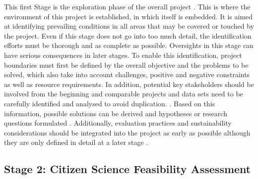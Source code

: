 This first Stage is the exploration phase of the overall project \autocite{citizenscience.govBasicStepsYour}. This is where the environment of this project is established, in which itself is embedded. It is aimed at identifying prevailing conditions in all areas that may be covered or touched by the project. Even if this stage does not go into too much detail, the identification efforts must be thorough and as complete as possible. Oversights in this stage can have serious consequences in later stages. To enable this identification, project boundaries must first be defined by the overall objective and the problems to be solved, which also take into account challenges, positive and negative constraints as well as resource requirements. In addition, potential key stakeholders should be involved from the beginning and comparable projects and data sets need to be carefully identified and analysed to avoid duplication. \autocite{citizenscience.govBasicStepsYour,fraislCitizenScienceEnvironmental2022,minkmanCitizenScienceWater2015}. Based on this information, possible solutions can be derived and hypotheses or research questions formulated \autocite{fraislCitizenScienceEnvironmental2022, silvertownNewDawnCitizen2009}. Additionally, evaluation practices and sustainability considerations should be integrated into the project as early as possible although they are only defined in detail at a later stage \autocite{fraislCitizenScienceEnvironmental2022}.

\subsection{Stage 2: Citizen Science Feasibility Assessment}\label{subsec:stage2_design}

